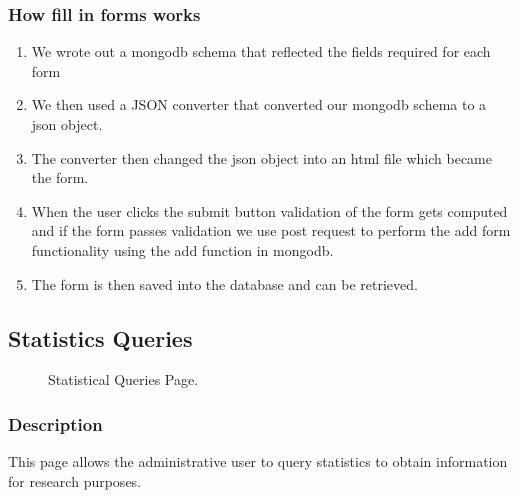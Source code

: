 \documentclass[14pt, a4paper]{article}
\begin{document}
	\subsubsection{How fill in forms works}
	\begin{enumerate}
			\item We wrote out a mongodb schema that reflected the fields required for each form  
			\item We then used a JSON converter that converted our mongodb schema to a json object.
			\item The converter then changed the json object into an html file which became the form. 
			\item When the user clicks the submit button validation of the form gets computed and if the form passes validation we use post request to perform the add form functionality using the add function in mongodb.
			\item  The form is then saved into the database and can be retrieved.
		\end{enumerate}
	


\subsection{Statistics Queries}
	\begin{figure}[H]
		\centerline{}
		\caption{Statistical Queries Page.}
		\label{fig:statsQ1}
	\end{figure}
	\subsubsection{Description} This page allows the administrative user to query statistics to obtain information for research purposes.
\end{document}
